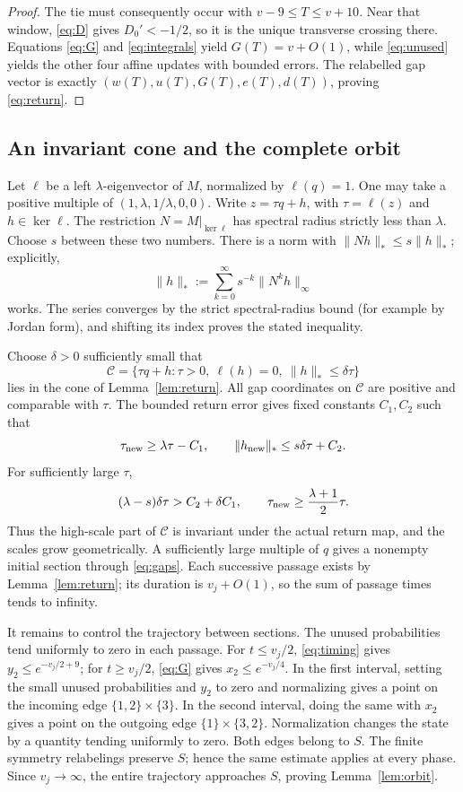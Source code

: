\documentclass[11pt,a4paper]{article}
\numberwithin{equation}{section}
\theoremstyle{definition}
\begin{document}
\begin{proof}
The tie must consequently occur with \(v-9\le T\le v+10\).
Near that window, \eqref{eq:D} gives \(D_0'<-1/2\), so it is the
unique transverse crossing there. Equations \eqref{eq:G} and
\eqref{eq:integrals} yield \(G(T)=v+O(1)\), while
\eqref{eq:unused} yields the other four affine updates with bounded
errors. The relabelled gap vector is exactly
\((w(T),u(T),G(T),e(T),d(T))\), proving \eqref{eq:return}.
\end{proof}

\subsection{An invariant cone and the complete orbit}

Let \(\ell\) be a left \(\lambda\)-eigenvector of \(M\), normalized
by \(\ell(q)=1\). One may take a positive multiple of
\((1,\lambda,1/\lambda,0,0)\). Write
\(z=\tau q+h\), with \(\tau=\ell(z)\) and \(h\in\ker\ell\).
The restriction \(N=M|_{\ker\ell}\) has spectral radius strictly
less than \(\lambda\). Choose \(s\) between these two numbers.
There is a norm with \(\|Nh\|_*\le s\|h\|_*\); explicitly,
\[
 \|h\|_*:=\sum_{k=0}^{\infty}s^{-k}\|N^kh\|_\infty
\]
works. The series converges by the strict spectral-radius bound
(for example by Jordan form), and shifting its index proves the
stated inequality.

Choose \(\delta>0\) sufficiently small that
\[
 \mathcal C=\{\tau q+h:\tau>0,\ \ell(h)=0,
                         \ \|h\|_*\le\delta\tau\}
\]
lies in the cone of Lemma~\ref{lem:return}. All gap coordinates on
\(\mathcal C\) are positive and comparable with \(\tau\).
The bounded return error gives fixed constants \(C_1,C_2\) such that
\[
 \tau_{\rm new}\ge\lambda\tau-C_1,
 \qquad \|h_{\rm new}\|_*\le s\delta\tau+C_2.
\]
For sufficiently large \(\tau\),
\[
 (\lambda-s)\delta\tau>C_2+\delta C_1,
 \qquad \tau_{\rm new}\ge\frac{\lambda+1}{2}\tau.
\]
Thus the high-scale part of \(\mathcal C\) is invariant under the
actual return map, and the scales grow geometrically. A sufficiently
large multiple of \(q\) gives a nonempty initial section through
\eqref{eq:gaps}. Each successive passage exists by
Lemma~\ref{lem:return}; its duration is \(v_j+O(1)\), so the sum
of passage times tends to infinity.

It remains to control the trajectory between sections. The unused
probabilities tend uniformly to zero in each passage. For
\(t\le v_j/2\), \eqref{eq:timing} gives
\(y_2\le e^{-v_j/2+9}\); for \(t\ge v_j/2\),
\eqref{eq:G} gives \(x_2\le e^{-v_j/4}\).
In the first interval, setting the small unused probabilities and
\(y_2\) to zero and normalizing gives a point on the incoming edge
\(\{1,2\}\times\{3\}\). In the second interval, doing the same
with \(x_2\) gives a point on the outgoing edge
\(\{1\}\times\{3,2\}\). Normalization changes the state by a
quantity tending uniformly to zero. Both edges belong to \(S\).
The finite symmetry relabelings preserve \(S\); hence the same
estimate applies at every phase. Since \(v_j\to\infty\), the
entire trajectory approaches \(S\), proving Lemma~\ref{lem:orbit}.
\end{document}
